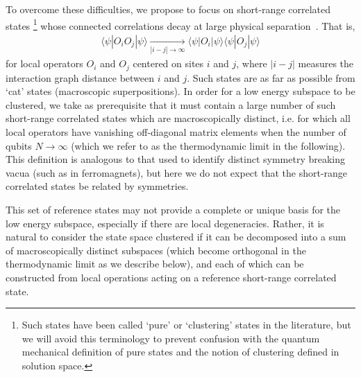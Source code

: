 \documentclass[aps,pra,twocolumn,superscriptaddress,amsmath]{revtex4-1}
\newcommand{\bra}[1]{\langle#1|}
\newcommand{\ket}[1]{|#1\rangle}
\begin{document}

To overcome these difficulties, we propose to focus on short-range correlated states %
\footnote{Such states have been called `pure' or `clustering' states in the literature, but we will avoid this terminology to prevent confusion with the quantum mechanical definition of pure states and the notion of clustering defined in solution space.} 
whose connected correlations decay at large physical separation~\cite{SpinGlassTheoryBook1986}. That is,
%
\begin{align}
	\bra{\psi} O_i O_j \ket{\psi} \xrightarrow[|i-j| \to \infty]{} \bra{\psi}O_i\ket{\psi}\bra{\psi} O_j \ket{\psi}
\end{align}
%
for local operators $O_i$ and $O_j$ centered on sites $i$ and $j$, where $|i - j|$ measures the interaction graph distance between $i$ and $j$. 
Such states are as far as possible from `cat' states (macroscopic superpositions). 
In order for a low energy subspace to be clustered, we take as prerequisite that it must contain a large number of such short-range correlated states which are macroscopically distinct, i.e. for which all local operators have vanishing off-diagonal matrix elements when the number of qubits $N\rightarrow\infty$ (which we refer to as the thermodynamic limit in the following).
This definition is analogous to that used to identify distinct symmetry breaking vacua (such as in ferromagnets), but here we do not expect that the short-range correlated states be related by symmetries. 

This set of reference states may not provide a complete or unique basis for the low energy subspace, especially if there are local degeneracies. 
Rather, it is natural to consider the state space clustered if it can be decomposed into a sum of macroscopically distinct subspaces (which become orthogonal in the thermodynamic limit as we describe below), and each of which can be constructed from local operations acting on a reference short-range correlated state.
\end{document}
